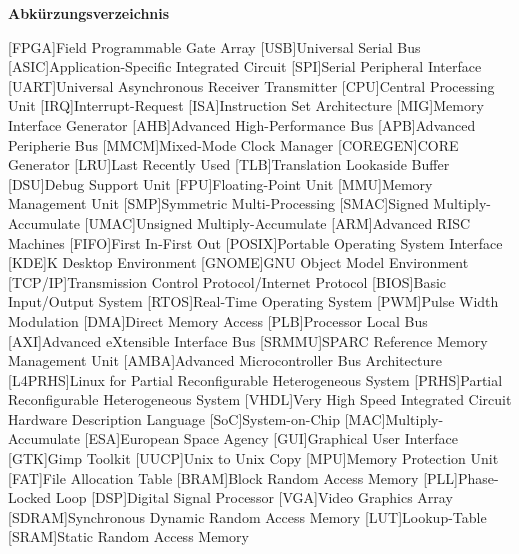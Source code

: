 
{\textbf{Abkürzungsverzeichnis}}

\begin{acronym}[Bash]
 [FPGA]{Field Programmable Gate Array}
 [USB]{Universal Serial Bus}
 [ASIC]{Application-Specific Integrated Circuit}
 [SPI]{Serial Peripheral Interface}
 [UART]{Universal Asynchronous Receiver Transmitter}
 [CPU]{Central Processing Unit}
 [IRQ]{Interrupt-Request}
 [ISA]{Instruction Set Architecture}
 [MIG]{Memory Interface Generator}
 [AHB]{Advanced High-Performance Bus}
  [APB]{Advanced Peripherie Bus}
 [MMCM]{Mixed-Mode Clock Manager}
 [COREGEN]{CORE Generator}
  [LRU]{Last Recently Used}
  [TLB]{Translation Lookaside Buffer}
  [DSU]{Debug Support Unit}
  [FPU]{Floating-Point Unit}
 [MMU]{Memory Management Unit}
  [SMP]{Symmetric Multi-Processing}
 [SMAC]{Signed Multiply-Accumulate}
  [UMAC]{Unsigned Multiply-Accumulate}
 [ARM]{Advanced RISC Machines}
 [FIFO]{First In-First Out}
 [POSIX]{Portable Operating System Interface}
 [KDE]{K Desktop Environment}
 [GNOME]{GNU Object Model Environment}
  [TCP/IP]{Transmission Control Protocol/Internet Protocol}
[BIOS]{Basic Input/Output System}
 [RTOS]{Real-Time Operating System}
 [PWM]{Pulse Width Modulation}
  [DMA]{Direct Memory Access}
 [PLB]{Processor Local Bus}
 [AXI]{Advanced eXtensible Interface Bus}
[SRMMU]{SPARC Reference Memory Management Unit}
 [AMBA]{Advanced Microcontroller Bus Architecture}
  [L4PRHS]{Linux for Partial Reconfigurable Heterogeneous System}
   [PRHS]{Partial Reconfigurable Heterogeneous System}
[VHDL]{Very High Speed Integrated Circuit Hardware Description Language}
[SoC]{System-on-Chip}
[MAC]{Multiply-Accumulate}
 [ESA]{European Space Agency}
 [GUI]{Graphical User Interface}
 [GTK]{Gimp Toolkit}
 [UUCP]{Unix to Unix Copy}
 [MPU]{Memory Protection Unit}
[FAT]{File Allocation Table}
  [BRAM]{Block Random Access Memory}
  [PLL]{Phase-Locked Loop}
  [DSP]{Digital Signal Processor}
  [VGA]{Video Graphics Array}
[SDRAM]{Synchronous Dynamic Random Access Memory}
 [LUT]{Lookup-Table}
 [SRAM]{Static Random Access Memory}

\end{acronym}

